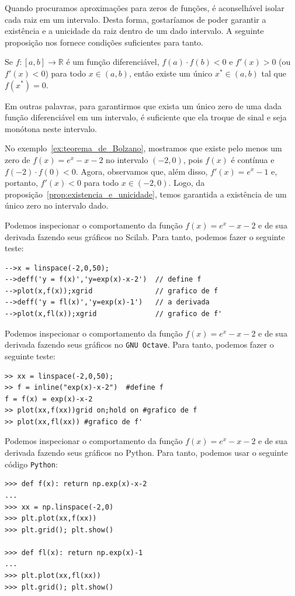 Quando procuramos aproximações para zeros de funções, é aconselhável isolar cada raiz em um intervalo. Desta forma, gostaríamos de poder garantir a existência e a unicidade da raiz dentro de um dado intervalo. A seguinte proposição nos fornece condições suficientes para tanto.

\begin{prop}\label{prop:existencia_e_unicidade}
Se $f:[a, b]\to\mathbb{R}$ é um função diferenciável, $f(a)\cdot f(b)<0$ e $f'(x)>0$ (ou $f'(x)<0$) para todo $x\in(a, b)$, então existe um único $x^*\in (a, b)$ tal que $f(x^*) = 0$.
\end{prop}

Em outras palavras, para garantirmos que exista um único zero de uma dada função diferenciável em um intervalo, é suficiente que ela troque de sinal e seja monótona neste intervalo.

\begin{ex}
No exemplo~\ref{ex:teorema_de_Bolzano}, mostramos que existe pelo menos um zero de $f(x) = e^{x}-x-2$ no intervalo $(-2,0)$, pois $f(x)$ é contínua e $f(-2)\cdot f(0) < 0$. Agora, observamos que, além disso, $f'(x)=e^x-1$ e, portanto, $f'(x)<0$ para todo $x\in(-2,0)$. Logo, da proposição~\ref{prop:existencia_e_unicidade}, temos garantida a existência de um único zero no intervalo dado.

\ifisscilab
Podemos inspecionar o comportamento da função $f(x)= e^x - x - 2$ e de sua derivada fazendo seus gráficos no Scilab. Para tanto, podemos fazer o seguinte teste:
\begin{verbatim}
-->x = linspace(-2,0,50);
-->deff('y = f(x)','y=exp(x)-x-2')  // define f
-->plot(x,f(x));xgrid               // grafico de f
-->deff('y = fl(x)','y=exp(x)-1')   // a derivada
-->plot(x,fl(x));xgrid              // grafico de f'
\end{verbatim}
\fi
\ifisoctave
Podemos inspecionar o comportamento da função $f(x)= e^x - x - 2$ e de sua derivada fazendo seus gráficos no \verb+GNU Octave+. Para tanto, podemos fazer o seguinte teste:
\begin{verbatim}
>> xx = linspace(-2,0,50);
>> f = inline("exp(x)-x-2")  #define f
f = f(x) = exp(x)-x-2
>> plot(xx,f(xx))grid on;hold on #grafico de f
>> plot(xx,fl(xx)) #grafico de f'
\end{verbatim}
\fi
\ifispython
Podemos inspecionar o comportamento da função $f(x)= e^x - x - 2$ e de sua derivada fazendo seus gráficos no Python. Para tanto, podemos usar o seguinte código \verb+Python+:
\begin{verbatim}
>>> def f(x): return np.exp(x)-x-2
... 
>>> xx = np.linspace(-2,0)
>>> plt.plot(xx,f(xx))
>>> plt.grid(); plt.show()

>>> def fl(x): return np.exp(x)-1
... 
>>> plt.plot(xx,fl(xx))
>>> plt.grid(); plt.show()
\end{verbatim}
\fi
\end{ex}

